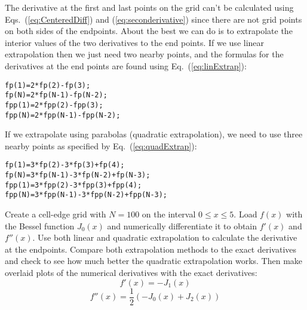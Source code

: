 The derivative at the first and last points on the grid can't be
calculated using Eqs.~(\ref{eq:CenteredDiff}) and
(\ref{eq:seconderivative}) since there are not grid points on both
sides of the endpoints. About the best we can do is to extrapolate
the interior values of the two derivatives to the end
points. If we use linear extrapolation
 then we just need two nearby points, and
the formulas for the derivatives at the end points are found using
Eq.~(\ref{eq:linExtrap}):
\begin{Verbatim}
fp(1)=2*fp(2)-fp(3);
fp(N)=2*fp(N-1)-fp(N-2);
fpp(1)=2*fpp(2)-fpp(3);
fpp(N)=2*fpp(N-1)-fpp(N-2);
\end{Verbatim}
If we extrapolate using parabolas (quadratic extrapolation),
  we need to use three nearby points
as specified by Eq.~(\ref{eq:quadExtrap}):
\begin{Verbatim}
fp(1)=3*fp(2)-3*fp(3)+fp(4);
fp(N)=3*fp(N-1)-3*fp(N-2)+fp(N-3);
fpp(1)=3*fpp(2)-3*fpp(3)+fpp(4);
fpp(N)=3*fpp(N-1)-3*fpp(N-2)+fpp(N-3);
\end{Verbatim}

\begin{enumerate}
\prob \label{P:1.Deriv} 

    Create a cell-edge grid with $N=100$ on the interval $0 \le x
    \le 5$. Load $f(x)$ with the Bessel function $J_0(x)$ and
    numerically differentiate it to obtain $f'(x)$ and $f''(x)$.
    Use both linear and quadratic extrapolation to calculate the
    derivative at the endpoints. Compare both extrapolation
    methods to the exact derivatives and check to see how much
    better the quadratic extrapolation works. Then make overlaid
    plots of the numerical derivatives with the exact
    derivatives:
    \[
        f'(x) = -J_1(x)
    \]
    \[
        f''(x) = \frac{1}{2} \left( -J_0(x) + J_2(x) \right)
    \]
\end{enumerate}



